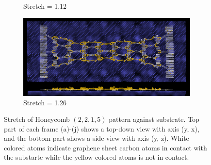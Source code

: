 \begin{figure}[H]
\begin{subfigure}[b]{0.49\textwidth}
        \caption{Stretch = 1.12}
        \label{fig:}
    \end{subfigure}
    \begin{subfigure}[b]{0.49\textwidth}
        \centering
        \includegraphics[width=\textwidth]{figures/baseline/contact_vs_stretch/honeycomb/hon_stretch0126.png}
        \caption{Stretch = 1.26}
        \label{fig:}
    \end{subfigure}
    \hfill
       \caption{Stretch of Honeycomb $(2,2,1,5)$ pattern against substrate. Top part of each frame (a)-(j) shows a top-down view with axis (y, x), and the bottom part shows a side-view with axis (y, z). White colored atoms indicate graphene sheet carbon atoms in contact with the substarte while the yellow colored atoms is not in contact.}
       \label{fig:}
  \end{figure}
  



  

